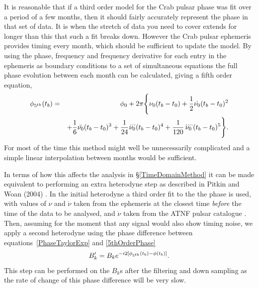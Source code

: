 It is reasonable that if a third order model for the Crab pulsar phase was fit over a period of a
few months, then it should fairly accurately represent the phase in that set of data. It is when the
stretch of data you need to cover extends for longer than this that such a fit breaks down. However
the Crab pulsar ephemeris provides timing every month, which should be sufficient to update the
model. By using the phase, frequency and frequency derivative for each entry in the ephemeris as
boundary conditions to a set of simultaneous equations the full phase evolution between each month
can be calculated, giving a fifth order equation,
\begin{eqnarray}\label{5thOrderPhase}
\phi_{5^{\rm th}}(t_b) & = & \phi_0 + 2\pi\Bigg\{\nu_0(t_b-t_0) + \frac{1}{2}\dot{\nu_0}(t_b-t_0)^2
\nonumber \\ 
& & + \frac{1}{6}\ddot{\nu_0}(t_b-t_0)^3 + \frac{1}{24}\dddot{\nu_0}(t_b-t_0)^4 +
\frac{1}{120}\ddddot{\nu_0}(t_b-t_0)^5\Bigg\}.
\end{eqnarray}
For most of the time this method might well be unnecessarily complicated and a simple linear
interpolation between months would be sufficient.

In terms of how this affects the analysis in \S\ref{TimeDomainMethod} it can be made equivalent to
performing an extra heterodyne step as described in Pitkin and Woan (2004) \cite{PitkinWoan:2004}.
In the initial heterodyne a third order fit to the the phase is used, with values of $\nu$ and
$\dot{\nu}$ taken from the ephemeris at the closest time \emph{before} the time of the data to be
analysed, and $\ddot{\nu}$ taken from the ATNF pulsar catalogue \cite{ATNF}. Then, assuming for the
moment that any \gw signal would also show timing noise, we apply a second heterodyne using the
phase difference between equations~\ref{PhaseTaylorExp} and \ref{5thOrderPhase}
\begin{equation}\label{extraheterodyne}
B_{k}' = B_ke^{-i2[\phi_{5^{\rm th}}(t_b) - \phi(t_b)]}.
\end{equation} 
This step can be performed on the $B_k$s after the filtering and down sampling as the rate of change
of this phase difference will be very slow.

